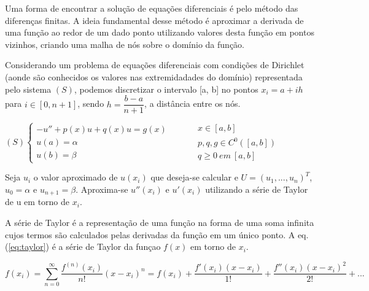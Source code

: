 \par Uma forma de encontrar a solução de equações diferenciais é pelo método das diferenças finitas. A ideia fundamental desse método é aproximar a derivada de uma função ao redor de um dado ponto utilizando valores desta função em pontos vizinhos, criando uma malha de nós sobre o domínio da função.
\par Considerando um problema de equações diferenciais com condições de Dirichlet (aonde são conhecidos os valores nas extremidadades do domínio) representada pelo sistema $(S)$, podemos discretizar o intervalo [a, b] no pontos $x_i = a + ih$ para $i \in [0, n+1]$, sendo $h = \dfrac{b-a}{n+1}$, a distância entre os nós.

\begin{center}
	\begin{math}
		(S)
		\left\{
    		\begin{array}{l}
      			-u'' + p(x)u + q(x)u = g(x) \\
				u(a) = \alpha\\
				u(b) = \beta      			
    		\end{array}
    		\begin{array}{l}
      		\qquad \\
			\qquad \\
			\qquad	   
    		\end{array}
    		\begin{array}{l}
      			x \in [a, b] \\
				p, q, g \in C^0([a, b])\\
				q \geq 0 \ em \ [a, b]
    		\end{array}
		\right.
	\end{math}
\end{center} 

\par Seja $u_i$ o valor aproximado de $u(x_i)$ que deseja-se calcular e $U = (u_1, ..., u_n)^T$, $u_0 = \alpha$ e $u_{n+1} = \beta$. Aproxima-se $u''(x_i)$ e $u'(x_i)$ utilizando a série de Taylor de u em torno de $x_i$.
\par A série de Taylor é a representação de uma função na forma de uma soma infinita cujos termos são calculados pelas derivadas da função em um único ponto.
A eq.(\ref{eq:taylor}) é a série de Taylor da funçao $f(x)$ em torno de $x_i$.

\begin{equation} \label{eq:taylor}
f(x_i) = \sum_{n=0}^\infty \dfrac{f^{(n)}(x_i)}{n!}(x-x_i)^n = f(x_i) + \dfrac{f'(x_i)(x-x_i)}{1!} + \dfrac{f''(x_i)(x-x_i)^2}{2!} + ...
\end{equation}

